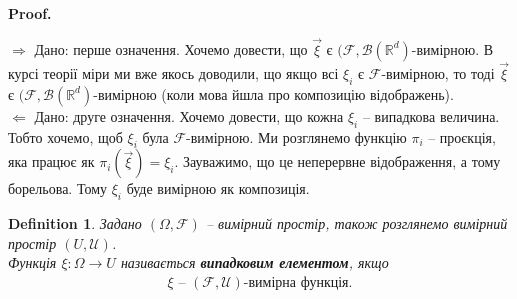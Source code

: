 \documentclass[a4paper, 10pt]{article}
\makeatletter
\def\rightproof{$\boxed{\Rightarrow}$ }
\def\leftproof{$\boxed{\Leftarrow}$ }
\theoremstyle{theoremdd}
\newtheorem{definition}[theorem]{Definition}
\renewenvironment{proof}[1][Proof.\\]{\par
\pushQED{\hfill \qed}%
\normalfont \topsep6\p@\@plus6\p@\relax
\trivlist
\item\relax
{\bfseries
#1\@addpunct{.}}\hspace\labelsep\ignorespaces
}{%
\popQED\endtrivlist\@endpefalse
}
\makeatother
\begin{document}
\begin{proof}
\rightproof Дано: перше означення. Хочемо довести, що $\vec{\xi}$ є $(\mathcal{F},\mathcal{B}(\mathbb{R}^d)$-вимірною. В курсі теорії міри ми вже якось доводили, що якщо всі $\xi_i$ є $\mathcal{F}$-вимірною, то тоді $\vec{\xi}$ є $(\mathcal{F},\mathcal{B}(\mathbb{R}^d)$-вимірною (коли мова йшла про композицію відображень).
\bigskip \\
\leftproof Дано: друге означення. Хочемо довести, що кожна $\xi_i$ -- випадкова величина. Тобто хочемо, щоб $\xi_i$ була $\mathcal{F}$-вимірною. Ми розглянемо функцію $\pi_i$ -- проєкція, яка працює як $\pi_i(\vec{\xi}) = \xi_i$. Зауважимо, що це неперервне відображення, а тому борельова. Тому $\xi_i$ буде вимірною як композиція.
\end{proof}

\begin{definition}
Задано $(\Omega,\mathcal{F})$ -- вимірний простір, також розглянемо вимірний простір $(U, \mathcal{U})$.\\
Функція $\xi \colon \Omega \to U$ називається \textbf{випадковим елементом}, якщо
\begin{align*}
\xi \text{ -- $(\mathcal{F},\mathcal{U})$-вимірна функція.}
\end{align*}
\end{definition}
\end{document}
